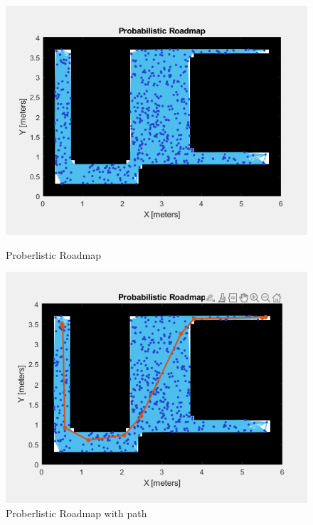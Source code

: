 \documentclass[12pt,a4paper]{article}
\begin{document}
\begin{figure}[!h]
		\noindent
		\begin{minipage}{0.5\textwidth}
			\includegraphics[width=\textwidth]{Proberlistic Roadmap}
			\caption{Proberlistic Roadmap}
			\label{fig:3}
		\end{minipage}%
		\begin{minipage}{0.5\textwidth}
			\includegraphics[width=\textwidth]{Proberlistic Roadmap with path}
			\caption{Proberlistic Roadmap with path}
			\label{fig:4}
		\end{minipage}
	\end{figure}
	
	
\end{document}
